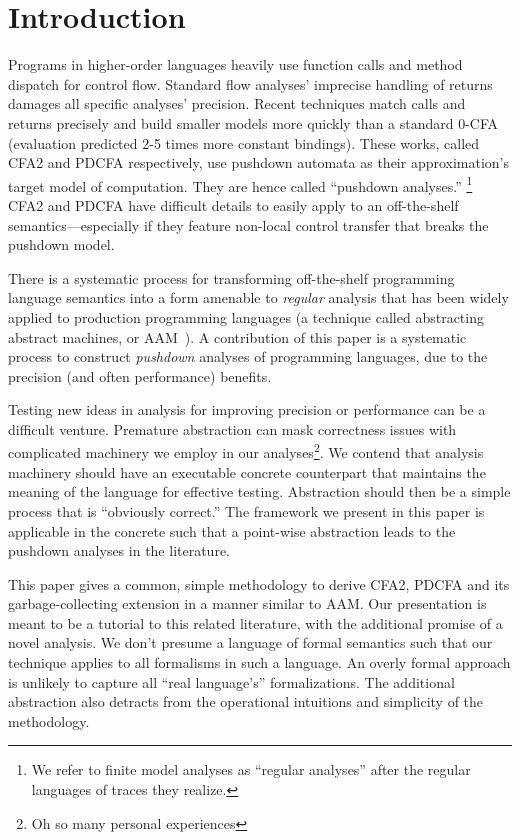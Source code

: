 
\section{Introduction}

Programs in higher-order languages heavily use function calls and method dispatch for control flow.
%
Standard flow analyses' imprecise handling of returns damages all specific analyses' precision.
%
Recent techniques match calls and returns precisely \citep{ianjohnson:vardoulakis-lmcs11, dvanhorn:Earl2010Pushdown} and build smaller models more quickly than a standard 0-CFA (evaluation predicted 2-5 times more constant bindings).
%
These works, called CFA2 and PDCFA respectively, use pushdown automata as their approximation's target model of computation.
%
They are hence called ``pushdown analyses.''%
%
\footnote{We refer to finite model analyses as ``regular analyses'' after the regular languages of traces they realize.}
%
CFA2 and PDCFA have difficult details to easily apply to an off-the-shelf semantics---especially if they feature non-local control transfer that breaks the pushdown model.

There is a systematic process for transforming off-the-shelf programming language semantics into a form amenable to \emph{regular} analysis that has been widely applied to production programming languages (a technique called abstracting abstract machines, or AAM~\citep{dvanhorn:VanHorn2010Abstracting}).
%
A contribution of this paper is a systematic process to construct \emph{pushdown} analyses of programming languages, due to the precision (and often performance) benefits.
%


Testing new ideas in analysis for improving precision or performance can be a difficult venture.
%
Premature abstraction can mask correctness issues with complicated machinery we employ in our analyses\footnote{Oh so many personal experiences}.
%
We contend that analysis machinery should have an executable concrete counterpart that maintains the meaning of the language for effective testing.
%
Abstraction should then be a simple process that is ``obviously correct.''
%
The framework we present in this paper is applicable in the concrete such that a point-wise abstraction leads to the pushdown analyses in the literature.

This paper gives a common, simple methodology to derive CFA2, PDCFA and its garbage-collecting extension in a manner similar to AAM.
%
Our presentation is meant to be a tutorial to this related literature, with the additional promise of a novel analysis.
%
We don't presume a language of formal semantics such that our technique applies to all formalisms in such a language.
%
An overly formal approach is unlikely to capture all ``real language's'' formalizations.
%
The additional abstraction also detracts from the operational intuitions and simplicity of the methodology.

